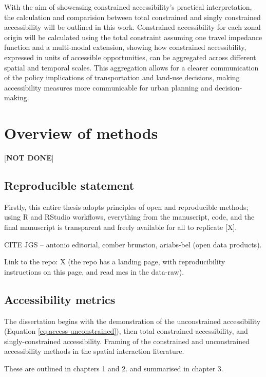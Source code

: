 \documentclass[
11pt, %
oneside, %
english, %
singlespacing, %
]{macthesis} %
\begin{document}
With the aim of showcasing constrained accessibility's practical interpretation, the calculation and comparision between total constrained and singly constrained accessibility will be outlined in this work. Constrained accessibility for each zonal origin will be calculated using the total constraint assuming one travel impedance function and a multi-modal extension, showing how constrained accessibility, expressed in units of accessible opportunities, can be aggregated across different spatial and temporal scales. This aggregation allows for a clearer communication of the policy implications of transportation and land-use decisions, making accessibility measures more communicable for urban planning and decision-making.

\section{Overview of methods}\label{overview-of-methods}

{[}\textbf{NOT DONE}{]}

\subsection{Reproducible statement}\label{reproducible-statement}

Firstly, this entire thesis adopts principles of open and reproducible methods; using R and RStudio workflows, everything from the manuscript, code, and the final manuscript is transparent and freely available for all to replicate {[}X{]}.

CITE JGS -- antonio editorial, comber brunston, ariabs-bel (open data products).

Link to the repo: X (the repo has a landing page, with reproducibility instructions on this page, and read mes in the data-raw).

\subsection{Accessibility metrics}\label{accessibility-metrics}

The dissertation begins with the demonstration of the unconstrained accessibility (Equation \ref{eq:access-unconstrained}), then total constrained accessibility, and singly-constrained accessibility. Framing of the constrained and unconstrained accessibility methods in the spatial interaction literature.

These are outlined in chapters 1 and 2. and summarised in chapter 3.
\end{document}
